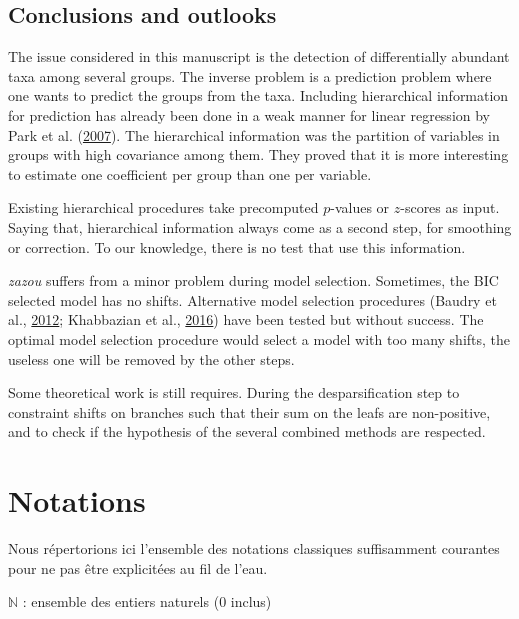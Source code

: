 \documentclass[12pt,a4paper]{reedthesis}
\newcommand \NN {\mathbb{N}}
\theoremstyle{definition}
\theoremstyle{definition}
\theoremstyle{definition}
\theoremstyle{remark}
\begin{document}
\hypertarget{conclusions-and-outlooks}{%
\section*{Conclusions and outlooks}\label{conclusions-and-outlooks}}

The issue considered in this manuscript is the detection of differentially abundant taxa among several groups. The inverse problem is a prediction problem where one wants to predict the groups from the taxa. Including hierarchical information for prediction has already been done in a weak manner for linear regression by Park et al. (\protect\hyperlink{ref-park2007averaged}{2007}). The hierarchical information was the partition of variables in groups with high covariance among them. They proved that it is more interesting to estimate one coefficient per group than one per variable.

Existing hierarchical procedures take precomputed \(p\)-values or \(z\)-scores as input. Saying that, hierarchical information always come as a second step, for smoothing or correction. To our knowledge, there is no test that use this information.

\emph{zazou} suffers from a minor problem during model selection. Sometimes, the BIC selected model has no shifts. Alternative model selection procedures (Baudry et al., \protect\hyperlink{ref-baudry2012slope}{2012}; Khabbazian et al., \protect\hyperlink{ref-khabbazian2016fast}{2016}) have been tested but without success. The optimal model selection procedure would select a model with too many shifts, the useless one will be removed by the other steps.

Some theoretical work is still requires. During the desparsification step to constraint shifts on branches such that their sum on the leafs are non-positive, and to check if the hypothesis of the several combined methods are respected.

\appendix

\hypertarget{notations}{%
\chapter{Notations}\label{notations}}

Nous répertorions ici l'ensemble des notations classiques suffisamment courantes pour ne pas être explicitées au fil de l'eau.

\(\NN\) : ensemble des entiers naturels (\(0\) inclus)
\end{document}
